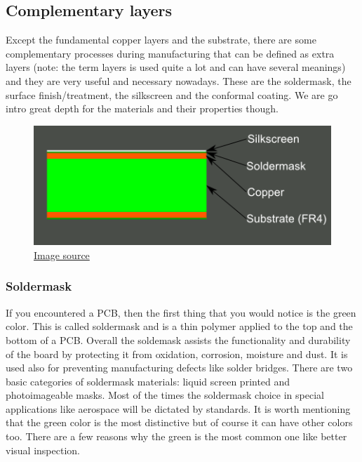 \documentclass[final]{cubedoc}
\begin{document}
	\subsection{Complementary layers}
	\label{subsec:complementary}
	
	Except the fundamental copper layers and the substrate, there are some complementary processes during manufacturing that can be defined as extra layers (note: the term layers is used quite a lot and can have several meanings) and they are very useful and necessary nowadays. These are the soldermask, the surface finish/treatment, the silkscreen and the conformal coating. We are go intro great depth for the materials and their properties though.
	
	\begin{figure}[h!]
		\centering
		\centering
		\includegraphics[keepaspectratio, height=0.25\textheight, width=.6\textwidth]{assets/2_layer_plus_silkscreen.png}
		\caption{\href{https://web.archive.org/web/20200814083524/https://learn.sparkfun.com/tutorials/using-eagle-board-layout/all}{Image source}}
	\end{figure}
	
	
	
	\subsubsection{Soldermask}
	
	If you encountered a PCB, then the first thing that you would notice is the green color. This is called soldermask and is a thin polymer applied to the top and the bottom of a PCB. Overall the soldemask assists the functionality and durability of the board by protecting it from oxidation, corrosion, moisture and dust. It is used also for preventing manufacturing defects like solder bridges.  There are two basic categories of soldermask materials: liquid screen printed and photoimageable masks. Most of the times the soldermask choice in special applications like aerospace will be dictated by standards. It is worth mentioning that the green color is the most distinctive but of course it can have other colors too. There are a few reasons why the green is the most common one like better visual inspection.
	
\end{document}
